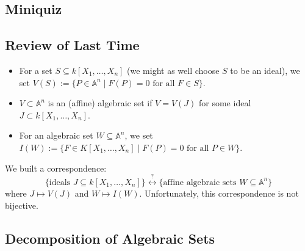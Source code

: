 \documentclass[12pt]{article}
\theoremstyle{definition}
\begin{document}
\subsection{Miniquiz}
\subsection{Review of Last Time}
\begin{itemize}
    \item For a set $S\subseteq k[X_1,\dotsc,X_n]$ (we might as well choose $S$ to be an ideal), we set $V(S):=\{P\in\mathbb{A}^n\mid F(P)=0\text{ for all }F\in S\}$.
    \item $V\subset\mathbb{A}^n$ is an (affine) algebraic set if $V=V(J)$ for some ideal $J\subset k[X_1,\dotsc,X_n]$.
    \item For an algebraic set $W\subseteq\mathbb{A}^n$, we set $I(W):=\{F\in K[X_1,\dotsc,X_n]\mid F(P)=0\text{ for all }P\in W\}$.
\end{itemize}
We built a correspondence:
\begin{equation*}
    \{\text{ideals }J\subseteq k[X_1,\dotsc,X_n]\}\stackrel{?}{\longleftrightarrow}\{\text{affine algebraic sets }W\subseteq\mathbb{A}^n\}
\end{equation*}
where $J\mapsto V(J)$ and $W\mapsto I(W)$. Unfortunately, this correspondence is not bijective.
\subsection{Decomposition of Algebraic Sets}
\end{document}
